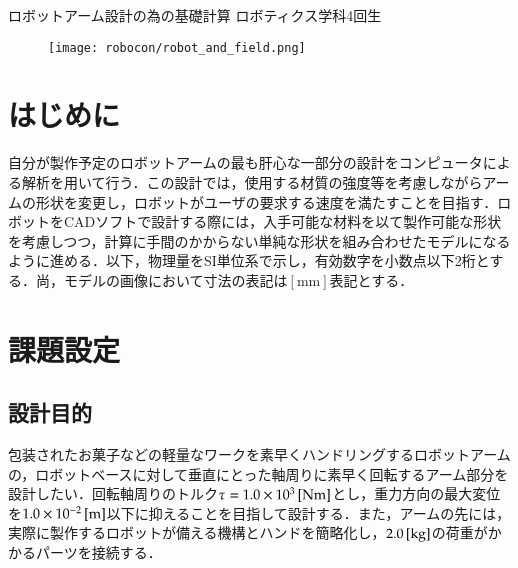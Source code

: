 \documentclass[10pt,b5paper,papersize,dvipdfmx]{jsbook}
\begin{document}

\newcommand\abesec[1]{\ref{#1}節}


\kaishititle%
  {ロボットアーム設計の為の基礎計算}%
  {ロボティクス学科4回生}%
  {}%

\begin{figure}[htbp]
  \centering
  \texttt{[image: robocon/robot\_and\_field.png]}
\end{figure}

%
\section*{はじめに}
自分が製作予定のロボットアームの最も肝心な一部分の設計をコンピュータによる解析を用いて行う．この設計では，使用する材質の強度等を考慮しながらアームの形状を変更し，ロボットがユーザの要求する速度を満たすことを目指す．ロボットをCADソフトで設計する際には，入手可能な材料を以て製作可能な形状を考慮しつつ，計算に手間のかからない単純な形状を組み合わせたモデルになるように進める．以下，物理量をSI単位系で示し，有効数字を小数点以下2桁とする．尚，モデルの画像において寸法の表記は$[\mathrm{mm}]$表記とする．

%
\section{課題設定}
\subsection{設計目的}
包装されたお菓子などの軽量なワークを素早くハンドリングするロボットアームの，ロボットベースに対して垂直にとった軸周りに素早く回転するアーム部分を設計したい．回転軸周りのトルク$\tau =1.0 \times 10^3 \tani*{Nm}$とし，重力方向の最大変位を$1.0 \times 10^{-2} \tani*{m}$以下に抑えることを目指して設計する．また，アームの先には，実際に製作するロボットが備える機構とハンドを簡略化し，$2.0 \tani*{kg}$の荷重がかかるパーツを接続する．
\end{document}
